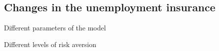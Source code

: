 \documentclass{beamer}
\begin{document}
\subsection{Changes in the unemployment insurance}

\begin{frame}{Different parameters of the model}




\end{frame}

\begin{frame}{Different levels of risk aversion}




\end{frame}
\end{document}
